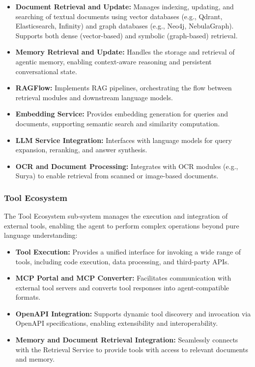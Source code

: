 \documentclass[../Main.tex]{subfiles}
\begin{document}
	\begin{itemize}
		\item \textbf{Document Retrieval and Update:} Manages indexing, updating,
			and searching of textual documents using vector databases (e.g., Qdrant,
			Elasticsearch, Infinity) and graph databases (e.g., Neo4j, NebulaGraph).
			Supports both dense (vector-based) and symbolic (graph-based) retrieval.

		\item \textbf{Memory Retrieval and Update:} Handles the storage and
			retrieval of agentic memory, enabling context-aware reasoning and persistent
			conversational state.

		\item \textbf{RAGFlow:} Implements RAG
			pipelines, orchestrating the flow between retrieval modules and downstream
			language models.

		\item \textbf{Embedding Service:} Provides embedding generation for queries
			and documents, supporting semantic search and similarity computation.

		\item \textbf{LLM Service Integration:} Interfaces with language models for
			query expansion, reranking, and answer synthesis.

		\item \textbf{OCR and Document Processing:} Integrates with OCR modules (e.g.,
			Surya) to enable retrieval from scanned or image-based documents.
	\end{itemize}

	\subsubsection{Tool Ecosystem}
	\label{section:4.1.3.2_tool_ecosystem} The Tool Ecosystem sub-system manages the
	execution and integration of external tools, enabling the agent to perform
	complex operations beyond pure language understanding:

	\begin{itemize}
		\item \textbf{Tool Execution:} Provides a unified interface for invoking a
			wide range of tools, including code execution, data processing, and third-party
			APIs.

		\item \textbf{MCP Portal and MCP Converter:} Facilitates communication with
			external tool servers and converts tool responses into agent-compatible
			formats.

		\item \textbf{OpenAPI Integration:} Supports dynamic tool discovery and
			invocation via OpenAPI specifications, enabling extensibility and interoperability.

		\item \textbf{Memory and Document Retrieval Integration:} Seamlessly
			connects with the Retrieval Service to provide tools with access to
			relevant documents and memory.
	\end{itemize}
\end{document}
